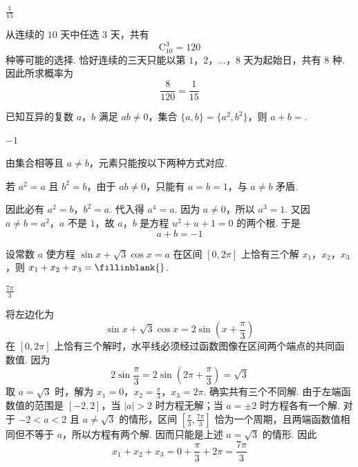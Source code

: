 \begin{answer}
\(\frac{1}{15}\)
\end{answer}

\begin{solution}
从连续的 \(10\) 天中任选 \(3\) 天，共有
\[
\mathrm C_{10}^{3}=120
\]
种等可能的选择. 恰好连续的三天只能以第 \(1\)，\(2\)，\(\ldots\)，\(8\) 天为起始日，共有 \(8\) 种. 因此所求概率为
\[
\frac8{120}=\frac1{15}
\]
\end{solution}

\begin{problem}
已知互异的复数 \(a\)，\(b\) 满足 \(ab \neq 0\)，集合 \(\{a, b\} = \{a^2, b^2\}\)，则 \(a + b =\)\fillinblank{}.
\end{problem}

\begin{answer}
\(-1\)
\end{answer}

\begin{solution}
由集合相等且 \(a\neq b\)，元素只能按以下两种方式对应.

若 \(a^2=a\) 且 \(b^2=b\)，由于 \(ab\neq0\)，只能有 \(a=b=1\)，与 \(a\neq b\) 矛盾.

因此必有
\(a^2=b\)，\(b^2=a\).
代入得 \(a^4=a\). 因为 \(a\neq0\)，所以 \(a^3=1\). 又因 \(a\neq b=a^2\)，\(a\) 不是 \(1\)，故 \(a\)，\(b\) 是方程 \(u^2+u+1=0\) 的两个根. 于是
\[
a+b=-1
\]
\end{solution}

\begin{problem}
设常数 \(a\) 使方程 \(\sin x + \sqrt{3}\cos x = a\) 在区间 \([0, 2\pi]\) 上恰有三个解 \(x_1\)，\(x_2\)，\(x_3\)，则 \(x_1 + x_2 + x_3 =\fillinblank{}\).
\end{problem}

\begin{answer}
\(\frac{7\pi}{3}\)
\end{answer}

\begin{solution}
将左边化为
\[
\sin x+\sqrt3\cos x=2\sin\left(x+\frac\pi3\right)
\]
在 \([0,2\pi]\) 上恰有三个解时，水平线必须经过函数图像在区间两个端点的共同函数值. 因为
\[
2\sin\frac\pi3=2\sin\left(2\pi+\frac\pi3\right)=\sqrt3
\]
取 \(a=\sqrt3\) 时，解为
\(x_1=0\)，\(x_2=\frac\pi3\)，\(x_3=2\pi\).
确实共有三个不同解. 由于左端函数值的范围是 \([-2,2]\)，当 \(\lvert a\rvert>2\) 时方程无解；当 \(a=\pm2\) 时方程各有一个解. 对于 \(-2<a<2\) 且 \(a\neq\sqrt3\) 的情形，区间 \([\frac\pi3,\frac{7\pi}3]\) 恰为一个周期，且两端函数值相同但不等于 \(a\)，所以方程有两个解. 因而只能是上述 \(a=\sqrt3\) 的情形. 因此
\[
x_1+x_2+x_3=0+\frac\pi3+2\pi=\frac{7\pi}{3}
\]
\end{solution}

